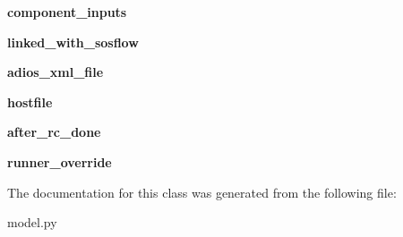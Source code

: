 \begin{DoxyCompactItemize}
\item 
\mbox{\label{classcodar_1_1cheetah_1_1model_1_1_run_component_a1d8cb3d579339ac5eba3c0311640b382}} 
{\bfseries component\+\_\+inputs}
\item 
\mbox{\label{classcodar_1_1cheetah_1_1model_1_1_run_component_a70c8417b14f64e93c812d52d63180e1f}} 
{\bfseries linked\+\_\+with\+\_\+sosflow}
\item 
\mbox{\label{classcodar_1_1cheetah_1_1model_1_1_run_component_a2a855ca947ebabda952f8dab7c1fe4a6}} 
{\bfseries adios\+\_\+xml\+\_\+file}
\item 
\mbox{\label{classcodar_1_1cheetah_1_1model_1_1_run_component_abcc514032d8dc3c203db3fea1e0cd94b}} 
{\bfseries hostfile}
\item 
\mbox{\label{classcodar_1_1cheetah_1_1model_1_1_run_component_a0ea6b3921652cd3852a5e2425d9a80ca}} 
{\bfseries after\+\_\+rc\+\_\+done}
\item 
\mbox{\label{classcodar_1_1cheetah_1_1model_1_1_run_component_ac5ca127f98817a9a14ef6d63d9b53d4f}} 
{\bfseries runner\+\_\+override}
\end{DoxyCompactItemize}


The documentation for this class was generated from the following file\+:\begin{DoxyCompactItemize}
\item 
model.\+py\end{DoxyCompactItemize}
